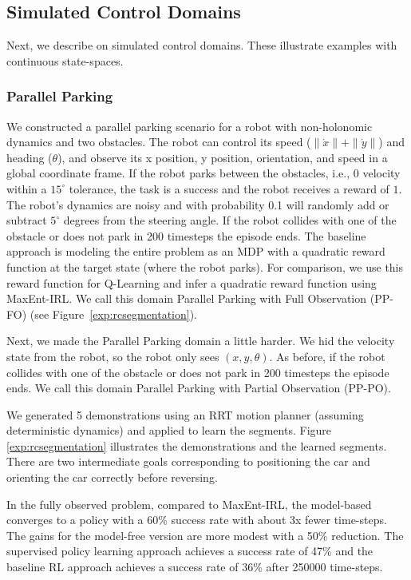 \subsection{Simulated Control Domains}
Next, we describe \hirl on simulated control domains. These illustrate examples with continuous state-spaces.

\subsubsection{Parallel Parking}\label{exp:pp}
We constructed a parallel parking scenario for a robot with non-holonomic dynamics and two obstacles. The robot can control its speed ($\|\dot{x}\|+\|\dot{y}\|$) and heading ($\theta$), and observe its x position, y position, orientation, and speed in a global coordinate frame.
If the robot parks between the obstacles, i.e., 0 velocity within a $15^\circ$ tolerance, the task is a success and the robot receives a reward of $1$. 
The robot's dynamics are noisy and with probability 0.1 will randomly add or subtract $5^\circ$ degrees from the steering angle.
If the robot collides with one of the obstacle or does not park in 200 timesteps the episode ends. 
The baseline approach is modeling the entire problem as an MDP with a quadratic reward function at the target state (where the robot parks).
For comparison, we use this reward function for Q-Learning and infer a quadratic reward function using MaxEnt-IRL.
We call this domain Parallel Parking with Full Observation (PP-FO) (see Figure~\ref{exp:rcsegmentation}).

Next, we made the  Parallel Parking domain a little harder. We hid the velocity state from the robot, so the robot only sees $(x,y,\theta)$. As before, if the robot collides with one of the obstacle or does not park in 200 timesteps the episode ends.
We call this domain Parallel Parking with Partial Observation (PP-PO).

We generated 5 demonstrations using an RRT motion planner (assuming deterministic dynamics) and applied \hirl to learn the segments.
Figure \ref{exp:rcsegmentation} illustrates the demonstrations and the learned segments. There are two intermediate goals corresponding to positioning the car and orienting the car correctly before reversing.

In the fully observed problem, compared to MaxEnt-IRL, the model-based \hirl converges to a policy with a 60\% success rate with about 3x fewer time-steps.
The gains for the model-free version are more modest with a 50\% reduction.
The supervised policy learning approach achieves a success rate of 47\% and the baseline RL approach achieves a success rate of 36\% after 250000 time-steps.

